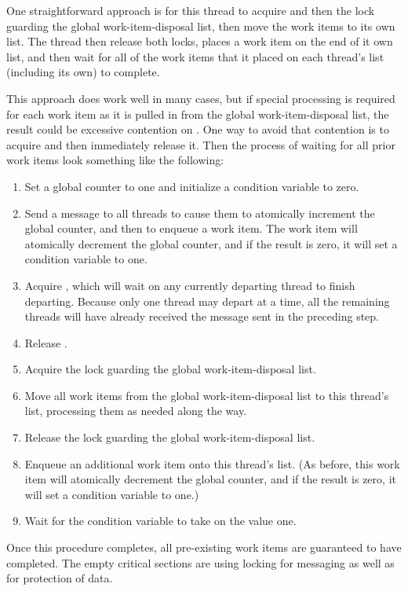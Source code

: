	One straightforward approach is for this thread to acquire 
	and then the lock guarding the global work-item-disposal list, then
	move the work items to its own list.
	The thread then release both locks,
	places a work item on the end of it own list,
	and then wait for all of the work items that it placed on each thread's
	list (including its own) to complete.

	This approach does work well in many cases, but if special
	processing is required for each work item as it is pulled in
	from the global work-item-disposal list, the result could be
	excessive contention on .
	One way to avoid that contention is to acquire  and then
	immediately release it.
	Then the process of waiting for all prior work items look
	something like the following:

	\begin{enumerate}
	\item	Set a global counter to one and initialize a condition
		variable to zero.
	\item	Send a message to all threads to cause them to atomically
		increment the global counter, and then to enqueue a
		work item.
		The work item will atomically decrement the global
		counter, and if the result is zero, it will set a
		condition variable to one.
	\item	Acquire , which will wait on any currently departing
		thread to finish departing.
		Because only one thread may depart at a time, all the
		remaining threads will have already received the message
		sent in the preceding step.
	\item	Release .
	\item	Acquire the lock guarding the global work-item-disposal list.
	\item	Move all work items from the global work-item-disposal list
		to this thread's list, processing them as needed along the way.
	\item	Release the lock guarding the global work-item-disposal list.
	\item	Enqueue an additional work item onto this thread's list.
		(As before, this work item will atomically decrement
		the global counter, and if the result is zero, it will
		set a condition variable to one.)
	\item	Wait for the condition variable to take on the value one.
	\end{enumerate}

	Once this procedure completes, all pre-existing work items are
	guaranteed to have completed.
	The empty critical sections are using locking for messaging as
	well as for protection of data.

